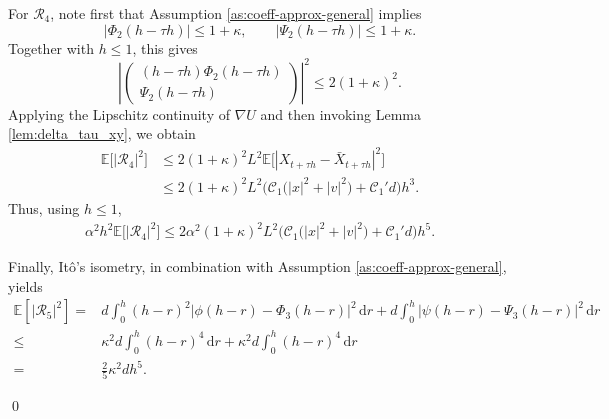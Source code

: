 \documentclass[12pt]{article}
\numberwithin{equation}{section}
\renewenvironment{proof}%
  {\begin{trivlist}%
   \item[]\ignorespaces}%
  {\qed\end{trivlist}}
\newcommand{\dd}{\mathrm{d}}
\begin{document}
\begin{proof}
For \(\mathcal R_4\), note first that Assumption \ref{as:coeff-approx-general} implies
\[
|\Phi_2(h-\tau h)|
\leq
1+\kappa,
\qquad
|\Psi_2(h-\tau h)|
\leq
1+\kappa.
\]
Together with \(h\leq1\), this gives
\[
\left|
\left(
\begin{aligned}
(h-\tau h)\Phi_2(h-\tau h)
\\
\Psi_2(h-\tau h)
\end{aligned}
\right)
\right|^2
\leq
2(1+\kappa)^2.
\]
Applying the Lipschitz continuity of \(\nabla U\) and then invoking Lemma \ref{lem:delta_tau_xy}, we obtain
\begin{equation}
\label{eq:R4-one-step-estimate}
\begin{aligned}
\mathbb E
\Big[\big|
\mathcal R_4
\big|^2\Big]
&\leq
2(1+\kappa)^2L^2
\mathbb E
\Big[
|X_{t+\tau h}-\bar X_{t+\tau h}|^2
\Big]
\\
&\leq
2(1+\kappa)^2L^2
\Big(
\mathcal C_1
\big(
|x|^2+|v|^2
\big)
+
\mathcal C_1'd
\Big)h^3.
\end{aligned}
\end{equation}
Thus, using \(h\leq1\),
\begin{equation}
\label{eq:alphaR4-one-step-estimate}
\begin{aligned}
\alpha^2h^2
\mathbb E
\Big[\big|
\mathcal R_4
\big|^2\Big]
\leq
2\alpha^2(1+\kappa)^2L^2
\Big(
\mathcal C_1
\big(
|x|^2+|v|^2
\big)
+
\mathcal C_1'd
\Big)h^5.
\end{aligned}
\end{equation}

Finally, It\^o's isometry, in combination with Assumption \ref{as:coeff-approx-general}, yields
\begin{equation}
\label{eq:R5-one-step-estimate}
\begin{aligned}
\mathbb E[|\mathcal R_5|^2]
=&
d
\int_0^h
(h-r)^2
\big|
\phi(h-r)-\Phi_3(h-r)
\big|^2\,\dd r
+
d
\int_0^h
\big|
\psi(h-r)-\Psi_3(h-r)
\big|^2\,\dd r
\\
\leq&
\kappa^2d
\int_0^h
(h-r)^4\,\dd r
+
\kappa^2d
\int_0^h
(h-r)^4\,\dd r
\\
=&
\tfrac{2}{5}\kappa^2dh^5 .
\end{aligned}
\end{equation}


\end{proof}
\end{document}
